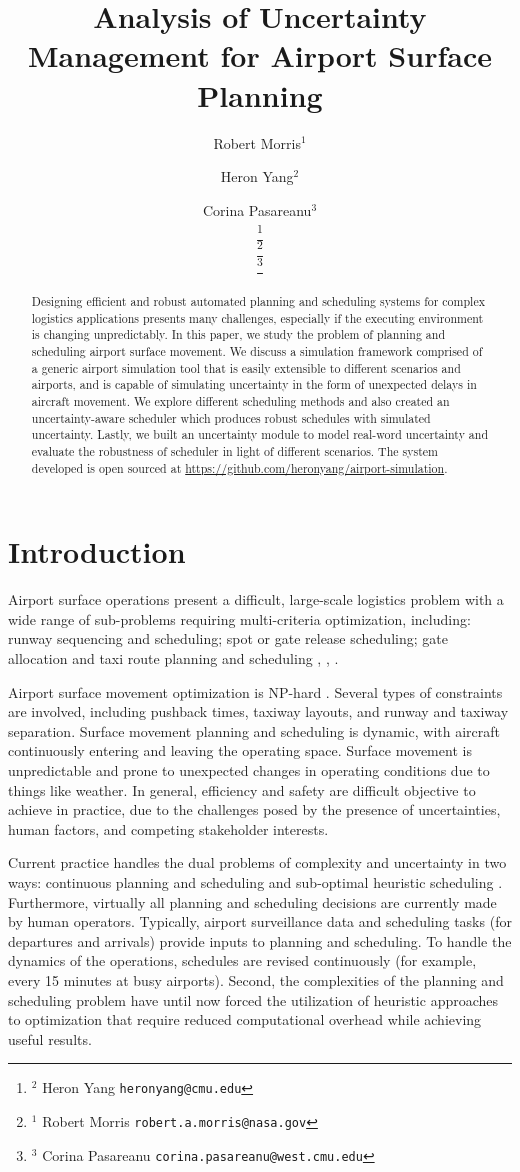 \documentclass[letterpaper, 10 pt, conference]{ieeeconf}
\title{Analysis of Uncertainty Management for Airport Surface Planning}%
\author{Robert Morris$^{1}$ \and Heron Yang$^{2}$  \and Corina Pasareanu$^{3}$ \\ %
\thanks{$^{2}$ Heron Yang {\tt\small heronyang@cmu.edu}} \\
\thanks{$^{1}$ Robert Morris {\tt\small robert.a.morris@nasa.gov}} \\%
\thanks{$^{3}$ Corina Pasareanu {\tt\small corina.pasareanu@west.cmu.edu}}%
}
\begin{document}
\maketitle
\begin{abstract}%
Designing efficient and robust automated planning and scheduling systems for complex logistics applications presents many challenges, especially if the executing environment is changing unpredictably.  In this paper, we study the problem of planning and scheduling airport surface movement. We discuss a simulation framework comprised of a generic airport simulation tool that is easily extensible to different scenarios and airports, and is capable of simulating uncertainty in the form of unexpected delays in aircraft movement. We explore different scheduling methods and also created an uncertainty-aware scheduler which produces robust schedules with simulated uncertainty. Lastly, we built an uncertainty module to model real-word uncertainty and evaluate the robustness of scheduler in light of different scenarios. The system developed is open sourced at \url{https://github.com/heronyang/airport-simulation}.
\end{abstract}
\section{Introduction}

Airport surface operations present a difficult, large-scale logistics problem with a wide range of sub-problems requiring multi-criteria optimization, including: runway sequencing and scheduling; spot or gate release scheduling; gate allocation and taxi route planning and scheduling \cite{malik} \cite{Rathinam}, \cite{Ravizza}, \cite{Roling}.

Airport surface movement optimization is NP-hard \cite{Reif}. Several types of constraints are involved, including pushback times, taxiway layouts, and runway and taxiway separation. Surface movement planning and scheduling is dynamic, with aircraft continuously entering and leaving the operating space. Surface movement is unpredictable and prone to unexpected changes in operating conditions due to things like weather. In general, efficiency and safety are difficult objective to achieve in practice, due to the challenges posed by the presence of uncertainties, human factors, and competing stakeholder interests.

Current practice handles the dual problems of complexity and uncertainty in two ways: continuous planning and scheduling and sub-optimal heuristic scheduling \cite{malik}.  Furthermore, virtually all planning and scheduling decisions are currently made by human operators. Typically, airport surveillance data and scheduling tasks (for departures and arrivals) provide inputs to planning and scheduling. To handle the dynamics of the operations, schedules are revised continuously (for example, every 15 minutes at busy airports). Second, the complexities of the planning and scheduling problem have until now forced the utilization of heuristic approaches to optimization that require reduced computational overhead while achieving useful results.
\end{document}
